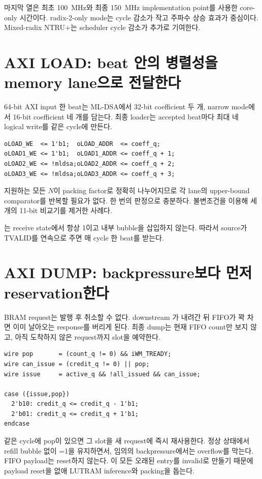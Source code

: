 마지막 열은 최초 100~MHz와 최종 150~MHz implementation point를 사용한 core-only
시간이다. radix-2-only mode는 cycle 감소가 작고 주파수 상승 효과가 중심이다.
Mixed-radix NTRU+는 scheduler cycle 감소가 추가로 기여한다.

\section{AXI LOAD: beat 안의 병렬성을 memory lane으로 전달한다}

64-bit AXI input 한 beat는 ML-DSA에서 32-bit coefficient 두 개, narrow mode에서
16-bit coefficient 네 개를 담는다. 최종 loader는 accepted beat마다 최대 네
logical write를 같은 cycle에 만든다.

\begin{lstlisting}
oLOAD_WE  <= 1'b1;  oLOAD_ADDR  <= coeff_q;
oLOAD1_WE <= 1'b1;  oLOAD1_ADDR <= coeff_q + 1;
oLOAD2_WE <= !mldsa;oLOAD2_ADDR <= coeff_q + 2;
oLOAD3_WE <= !mldsa;oLOAD3_ADDR <= coeff_q + 3;
\end{lstlisting}

지원하는 모든 $N$이 packing factor로 정확히 나누어지므로 각 lane의 upper-bound
comparator를 반복할 필요가 없다. 한 번의 
판정으로 충분하다. 불변조건을 이용해 세 개의 11-bit 비교기를 제거한 사례다.

는 receive state에서 항상 1이고 내부 bubble을 삽입하지
않는다. 따라서 source가 TVALID를 연속으로 주면 매 cycle 한 beat를 받는다.

\section{AXI DUMP: backpressure보다 먼저 reservation한다}

BRAM request는 발행 후 취소할 수 없다. downstream 가 내려간
뒤 FIFO가 꽉 차면 이미 날아오는 response를 버리게 된다. 최종 dump는 현재
FIFO count만 보지 않고, 아직 도착하지 않은 request까지 slot을 예약한다.

\begin{lstlisting}
wire pop       = (count_q != 0) && iWM_TREADY;
wire can_issue = (credit_q != 0) || pop;
wire issue     = active_q && !all_issued && can_issue;

case ({issue,pop})
  2'b10: credit_q <= credit_q - 1'b1;
  2'b01: credit_q <= credit_q + 1'b1;
endcase
\end{lstlisting}

같은 cycle에 pop이 있으면 그 slot을 새 request에 즉시 재사용한다. 정상
 상태에서 refill bubble 없이 \ii=1을 유지하면서, 임의의
backpressure에서는 overflow를 막는다. FIFO payload는 reset하지 않는다.
이 모든 오래된 entry를 invalid로 만들기 때문에 payload reset을
없애 LUTRAM inference와 packing을 돕는다.

